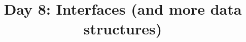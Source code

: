\documentclass{article}
\begin{document}
\title{Day 8: Interfaces (and more data structures)}
\date{}
\maketitle


\end{document}
